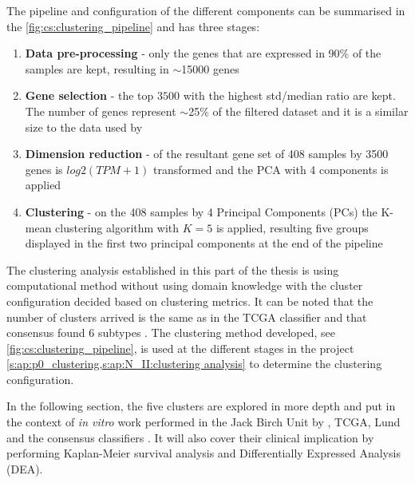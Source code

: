 The pipeline and configuration of the different components can be summarised in the \cref{fig:cs:clustering_pipeline} and has three stages:
\begin{enumerate}
    \item \textbf{Data pre-processing} - only the genes that are expressed in 90\% of the samples are kept, resulting in $\sim$15000 genes
    \item \textbf{Gene selection} - the top $3500$ with the highest std/median ratio are kept. The number of genes represent $\sim$25\% of the filtered dataset and it is a similar size to the data used by \citet{Robertson2017-mg}
    \item \textbf{Dimension reduction} - of the resultant gene set of 408 samples by 3500 genes is $log2(TPM+1)$ transformed and the PCA with 4 components is applied
    \item \textbf{Clustering} - on the 408 samples by 4 Principal Components (PCs) the K-mean clustering algorithm with $K=5$ is applied, resulting  five groups displayed in the first two principal components at the end of the pipeline
\end{enumerate}

The clustering analysis established in this part of the thesis is using  computational method without using domain knowledge with the cluster configuration decided based on clustering metrics. It can be noted that the number of clusters arrived is the same as in the TCGA classifier \citep{Robertson2017-mg} and that consensus found 6 subtypes \citep{Kamoun2020-tj}. The clustering method developed, see \cref{fig:cs:clustering_pipeline}, is used at the different stages in the project \cref{s:ap:p0_clustering,s:ap:N_II:clustering analysis} to determine the clustering configuration.

In the following section, the five clusters are explored in more depth and put in the context of \textit{in vitro} work performed in the Jack Birch Unit by \citet{Baker2022-bj}, TCGA, Lund and the consensus classifiers \citep{Robertson2017-mg, Marzouka2018-ge, Kamoun2020-tj}. It will also cover their clinical implication by performing Kaplan-Meier survival analysis and Differentially Expressed Analysis (DEA).

